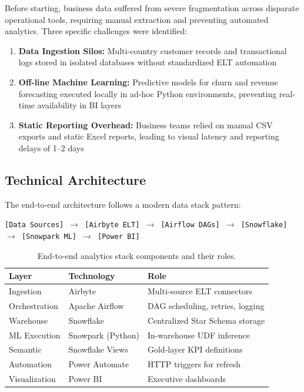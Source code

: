 \documentclass[11pt,a4paper]{article}
\begin{document}
Before starting, business data suffered from severe fragmentation across disparate operational tools, requiring manual extraction and preventing automated analytics. Three specific challenges were identified:
\begin{enumerate}[leftmargin=*,noitemsep,topsep=2pt]
    \item \textbf{Data Ingestion Silos:} Multi-country customer records and transactional logs stored in isolated databases without standardized ELT automation
    \item \textbf{Off-line Machine Learning:} Predictive models for churn and revenue forecasting executed locally in ad-hoc Python environments, preventing real-time availability in BI layers
    \item \textbf{Static Reporting Overhead:} Business teams relied on manual CSV exports and static Excel reports, leading to visual latency and reporting delays of 1--2 days
\end{enumerate}

\subsection{Technical Architecture}

The end-to-end architecture follows a modern data stack pattern:

\begin{center}
\small
\texttt{[Data Sources] $\rightarrow$ [Airbyte ELT] $\rightarrow$ [Airflow DAGs] $\rightarrow$ [Snowflake] $\rightarrow$ [Snowpark ML] $\rightarrow$ [Power BI]}
\end{center}

\begin{table}[H]
\caption{End-to-end analytics stack components and their roles.}
\setlength{\tabcolsep}{22pt}
\renewcommand{\arraystretch}{1.4}
\begin{tabular}{l l l}
\toprule
\textbf{Layer} & \textbf{Technology} & \textbf{Role} \\
\midrule
Ingestion & Airbyte & Multi-source ELT connectors \\
Orchestration & Apache Airflow & DAG scheduling, retries, logging \\
Warehouse & Snowflake & Centralized Star Schema storage \\
ML Execution & Snowpark (Python) & In-warehouse UDF inference \\
Semantic & Snowflake Views & Gold-layer KPI definitions \\
Automation & Power Automate & HTTP triggers for refresh \\
Visualization & Power BI & Executive dashboards \\
\bottomrule
\end{tabular}
\end{table}
\end{document}
